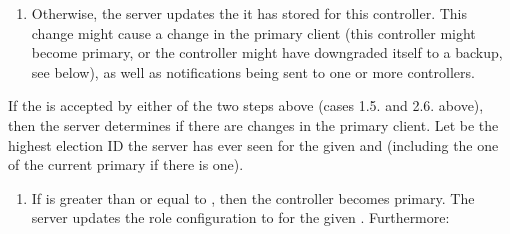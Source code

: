 \documentclass[11pt]{article}
\begin{document}
{\begin{enumerate}
\begin{enumerate}
\begin{enumerate}
\item{}
If the controller is a backup, this is a no-op and the 
is ignored. No response is sent to any controller.%
\end{enumerate}%

\item{}
Otherwise, the server updates the  it has stored for this
controller. This change might cause a change in the primary client (this
controller might become primary, or the controller might have downgraded
itself to a backup, see below), as well as notifications being sent to
one or more controllers.%
\end{enumerate}%
\end{enumerate}%

\noindent{}If the  is accepted by either of the two steps above
(cases 1.5. and 2.6. above), then the server determines if there are changes in
the primary client. Let  be the highest election ID the server
has ever seen for the given  and  (including the one of the
current primary if there is one).%

\begin{enumerate}%

\item{}
If  is greater than or equal to , then the
controller becomes primary. The server updates the role configuration to
 for the given . Furthermore:%


\end{enumerate}}
\end{document}
